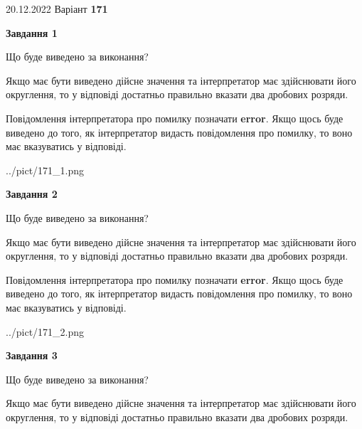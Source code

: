 \documentclass[12pt, ukrainian]{article}
\begin{document}
{20.12.2022 Варіант \No \textbf { 171 }\par}
{
\begin {Large}

{\begin {center}\textbf{Завдання 1}\end {center}}\par
Що буде виведено за виконання? \par

Якщо має бути виведено дійсне значення та інтерпретатор має здійснювати його округлення, 
то у відповіді достатньо правильно вказати два дробових розряди.

Повідомлення інтерпретатора про помилку позначати \textbf{error}.
Якщо щось буде виведено до того, як інтерпретатор видасть повідомлення про помилку, 
то воно має вказуватись у відповіді. \par

\begin{center}
	{../pict/171_1.png}
\end{center}
\newpage

{\begin {center}\textbf{Завдання 2}\end {center}}\par
Що буде виведено за виконання? \par

Якщо має бути виведено дійсне значення та інтерпретатор має здійснювати його округлення, 
то у відповіді достатньо правильно вказати два дробових розряди.

Повідомлення інтерпретатора про помилку позначати \textbf{error}.
Якщо щось буде виведено до того, як інтерпретатор видасть повідомлення про помилку, 
то воно має вказуватись у відповіді. \par

\begin{center}
	{../pict/171_2.png}
\end{center}
\newpage

{\begin {center}\textbf{Завдання 3}\end {center}}\par
Що буде виведено за виконання? \par

Якщо має бути виведено дійсне значення та інтерпретатор має здійснювати його округлення, 
то у відповіді достатньо правильно вказати два дробових розряди.


\end{Large}}
\end{document}
